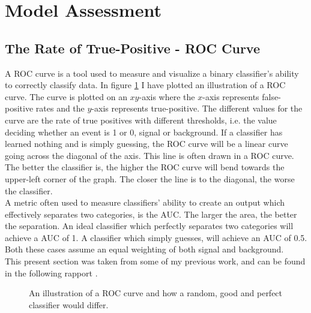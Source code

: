 \section{Model Assessment}\label{subsec:Assessment}
\subsection{The Rate of True-Positive - ROC Curve}\label{subsec:AUC}
A \ac{ROC} curve is a tool used to measure and visualize a binary classifier's ability 
to correctly classify data. In figure \ref{fig:ROC} I have plotted an illustration of a 
\ac{ROC} curve. The curve is plotted on an $xy$-axis where the $x$-axis represents 
false-positive rates and the $y$-axis represents true-positive. The different values 
for the curve are the rate of true positives with different thresholds, i.e. 
the value deciding whether an event is 1 or 0, signal or background. If a classifier 
has learned nothing and is simply guessing, the \ac{ROC} curve will be a linear curve 
going across the diagonal of the axis. This line is often drawn in a \ac{ROC} curve. The better the 
classifier is, the higher the \ac{ROC} curve will bend towards the upper-left corner of the 
graph. The closer the line is to the diagonal, the worse the classifier. 
\\
A metric often used to measure classifiers' ability to create an output which effectively 
separates two categories, is the \ac{AUC}. The larger the area, the better the separation. 
An ideal classifier which perfectly separates two categories will achieve a \ac{AUC} of 1.
A classifier which simply guesses, will achieve an \ac{AUC} of 0.5. Both these cases assume 
an equal weighting of both signal and background. 
\\
This present section was taken from some of my previous work, and can be found in the following 
rapport \cite{HirstFretteML}.
\begin{figure}
    \centering
    \caption{An illustration of a \acs{ROC} curve and how a random, good and perfect classifier would differ.}
    \label{fig:ROC}
\end{figure}
